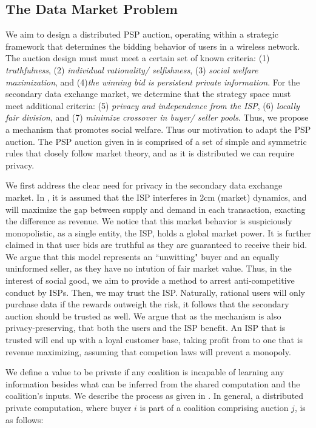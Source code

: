 \subsection{The Data Market Problem}

We aim to design a distributed PSP auction, operating within a strategic framework that
determines the bidding behavior of users in a wireless network.
The auction design must must meet a certain set of known
criteria: (1) \emph{truthfulness}, (2) \emph{individual rationality/
selfishness}, (3) \emph{social welfare maximization}, and (4)\emph{the winning
bid is persistent private information}. For the secondary data exchange
market, we determine that the
strategy space must meet additional criteria: (5) \emph{privacy and
independence from the ISP}, (6) \emph{locally fair division}, and (7)
\emph{minimize crossover in buyer/ seller pools}.
Thus, we propose a mechanism that promotes social welfare. 
Thus our motivation to adapt the PSP auction. The PSP auction given in
\cite{lazar} is comprised of a set of simple and symmetric rules that closely
follow market theory, and as it is distributed we can require privacy.

We first address the clear need for privacy in the secondary data exchange market. In \cite{zheng},
it is assumed that the ISP interferes in 2cm (market) dynamics, and will maximize the
gap between supply and demand in each transaction, exacting the difference as
revenue. We notice that this market behavior is suspiciously monopolistic, as a
single entity, the ISP, holds a global market power. It is further claimed in
\cite{zheng} that user bids are truthful as they are guaranteed to receive
their bid. We argue that this model represents an ``unwitting" buyer and an
equally uninformed seller, as they have no intution of fair market value.
Thus, in the interest of social good, we aim to provide a method to arrest
anti-competitive conduct by ISPs. Then, we may trust the ISP. Naturally,
rational users will only purchase data if the rewards outweigh the risk, it follows that
the secondary auction should be trusted as well. 
We argue that as the mechanism is also privacy-preserving, that both the users and the ISP benefit.
An ISP that is trusted will end up with a loyal customer base, taking profit
from to one that is revenue maximizing, assuming that competion laws will
prevent a monopoly.

We define a value to be private if any coalition is incapable of learning any information
besides what can be inferred from the shared computation and the coalition’s
inputs. We describe the process as given in \cite{felix}. In general, a distributed private
computation, where buyer $i$ is part of a coalition comprising auction $j$, is as follows: 

